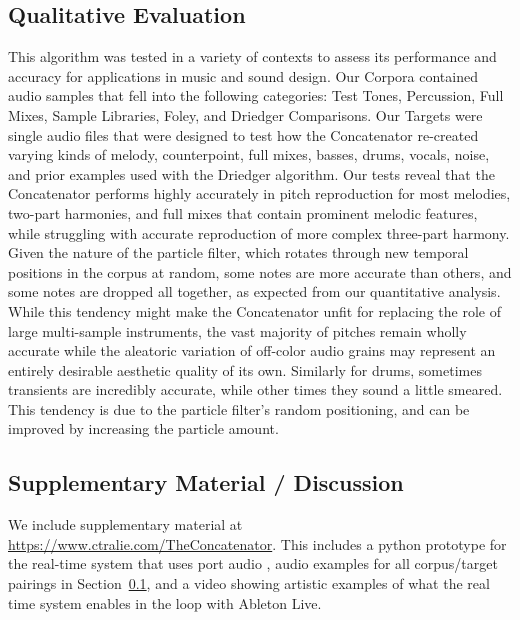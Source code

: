 \documentclass{article}
\begin{document}


\subsection{Qualitative Evaluation}
\label{sec:qualitative}

This algorithm was tested in a variety of contexts to assess its performance and accuracy for applications in music and sound design. Our Corpora contained audio samples that fell into the following categories: Test Tones, Percussion, Full Mixes, Sample Libraries, Foley, and Driedger Comparisons. Our Targets were single audio files that were designed to test how the Concatenator re-created varying kinds of melody, counterpoint, full mixes, basses, drums, vocals, noise, and prior examples used with the Driedger algorithm. 
Our tests reveal that the Concatenator performs highly accurately in pitch reproduction for most melodies, two-part harmonies, and full mixes that contain prominent melodic features, while struggling with accurate reproduction of more complex three-part harmony. 
Given the nature of the particle filter, which rotates through new temporal positions in the corpus at random, some notes are more accurate than others, and some notes are dropped all together, as expected from our quantitative analysis. While this tendency might make the Concatenator unfit for replacing the role of large multi-sample instruments, the vast majority of pitches remain wholly accurate while the aleatoric variation of off-color audio grains may represent an entirely desirable aesthetic quality of its own.
Similarly for drums, sometimes transients are incredibly accurate, while other times they sound a little smeared. This tendency is due to the particle filter's random positioning, and can be improved by increasing the particle amount.


\subsection{Supplementary Material / Discussion}

We include supplementary material at \url{https://www.ctralie.com/TheConcatenator}.  This includes a python prototype for the real-time system that uses port audio \cite{bencina2001portaudio}, audio examples for all corpus/target pairings in Section~\ref{sec:qualitative}, and a video showing artistic examples of what the real time system enables in the loop with Ableton Live.
\end{document}
